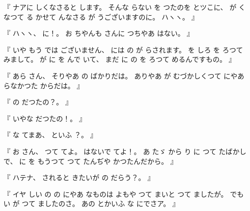 %
『
ナアに
しくなさると
します。
%
そんな
らない
を
つたのを
とツこに、
%
が
くなつて
る
かせて
んなさる
が
うございますのに。
%
ハヽヽ。
』

%
『
ハヽヽ、
%
に！。%
%
お
ちやんも
さんに
つちやあ
はない。
』

%
『
いや
もう
では
ございません、
%
には
の
が
らされます。
%
を
しろ
を
ろつて
みまして。
%
が
に
を
んで
いて、
%
まだ
に
の
を
ろつて
めるんですもの。
』

%
『
あら
さん、
%
そりやあ
の
ばかりだは。
%
ありやあ
が
むづかしくつて
にやあ
らなかつた
からだは。
』

%
『
の
だつたの？。
』

%
『
いやな
だつたの！。
』

%
『
な
てまあ、
%
といふ
？。
』

%
『
お
さん、
%
つて
てよ。
%
はないで
てよ！。
あ
たゞ%
から
り
に
つて
たばかしで、
%
に
を
もうつて
つて
たんぢや
かつたんだから。
』

%
『
ハテナ、
%
されると
きたいが
の
だらう？。
』

%
『
イヤ
しい
の
の
にやあ
なものは
よもや
つて
まいと
つて
ましたが。
%
でも
い
が
つて
ましたのさ。
%
あの
とかいふ
な
にでさア。
』

